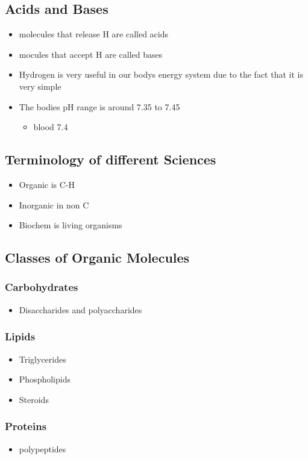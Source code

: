 \documentclass[11pt]{article}
\begin{document}
\subsection{Acids and Bases}
\label{sec:orga54f97e}
\begin{itemize}
\item molecules that release H are called acids
\item mocules that accept H are called bases
\item Hydrogen is very useful in our bodys energy system due to the fact that it is very simple
\item The bodies pH range is around 7.35 to 7.45
\begin{itemize}
\item blood 7.4
\end{itemize}
\end{itemize}
\subsection{Terminology of different Sciences}
\label{sec:orgea04270}
\begin{itemize}
\item Organic is C-H
\item Inorganic in non C
\item Biochem is living organisms
\end{itemize}
\subsection{Classes of Organic Molecules}
\label{sec:org838e433}
\subsubsection{Carbohydrates}
\label{sec:orgd05935e}
\begin{itemize}
\item Disaccharides and polyaccharides
\end{itemize}
\subsubsection{Lipids}
\label{sec:org896fc61}
\begin{itemize}
\item Triglycerides
\item Phospholipids
\item Steroids
\end{itemize}
\subsubsection{Proteins}
\label{sec:orgc84405d}
\begin{itemize}
\item polypeptides
\end{itemize}
\end{document}
